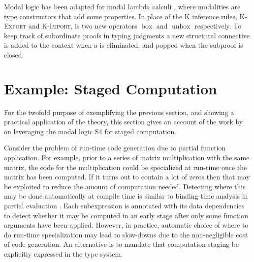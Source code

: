 \documentclass[12pt,twoside,openright]{report}
\numberwithin{equation}{chapter}
\numberwithin{figure}{chapter}
\numberwithin{table}{chapter}
\theoremstyle{definition}\newtheorem{definition}{Definition}
\newcommand{\lock}{\text{\tikz[baseline]{
      \fill[rounded corners=.1ex] (-.75ex,0) rectangle (.75ex,1ex);
      \draw[line width=.3ex] (-.4ex,.5ex) -- ++(0,.75ex) arc (180:0:.4ex) -- ++(0,-.75ex);
}}}
\begin{document}
Modal logic has been adapted for modal lambda calculi \cite{borghuis94},
where modalities are type constructors that add some properties.
In place of the K inference rules, \textsc{K-Export} and \textsc{K-Import},
is two new operators $\operatorname{box}$ and $\operatorname{unbox}$
respectively.
To keep track of subordinate proofs in typing judgments
a new structural connective \lock{} is added to the context when a \Box{} is eliminated,
and popped when the subproof is closed.

\section{Example: Staged Computation}\label{sec:staged-computation}

For the twofold purpose of exemplifying the previous section,
and showing a practical application of the theory,
this section gives an account of the work by \textcite{davies01}
on leveraging the modal logic S4 for staged computation.

Consider the problem of run-time code generation due to partial function application.
For example, prior to a series of matrix multiplication with the same matrix,
the code for the multiplication could be specialized at run-time
once the matrix has been computed.
If it turns out to contain a lot of zeros then that may be exploited
to reduce the amount of computation needed.
Detecting where this may be done automatically at compile time
is similar to binding-time analysis in partial evaluation \cite{leone94}.
Each subexpression is annotated with its data dependencies
to detect whether it may be computed in an early stage
after only some function arguments have been applied.
However, in practice, automatic choice of where to do run-time specialization
may lead to slow-downs due to the non-negligible cost of code generation.
An alternative is to mandate that computation staging be explicitly expressed
in the type system.
\end{document}
